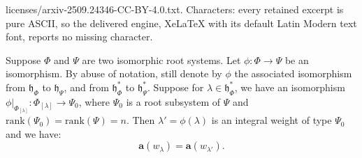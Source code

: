 \documentclass[10pt,a4paper]{amsart}
\newcommand{\aff}{ \mathbf{a} }
\newcommand{\lam}{\lambda}
\begin{document}
licenses/arxiv-2509.24346-CC-BY-4.0.txt. Characters: every retained excerpt is pure ASCII, so the delivered engine, XeLaTeX with its default Latin Modern text font, reports no missing character.
\begin{Thm}\label{transf}
    Suppose  $\Phi$ and $  \Psi$ are two isomorphic root systems. Let $\phi: \Phi \rightarrow \Psi$ be an isomorphism. By abuse of notation, still denote by $\phi$ the associated isomorphism  from $\mathfrak{h}_{\Phi}$ to $\mathfrak{h}_{\Psi}$, and from $\mathfrak{h}_{\Phi}^*$ to $\mathfrak{h}_{\Psi}^*$. Suppose for $\lam\in \mathfrak{h}_{\Phi}^*$, we have  an isomorphism  $\phi|_{\Phi_{[\lam]}}: \Phi_{[\lam]} \rightarrow \Psi_0 $, where $\Psi_0$ is a root subsystem of $\Psi$ and $\mathrm{rank} {(\Psi_0)}=\mathrm{rank} {(\Psi)}=n$. Then $\lam'=\phi(\lam)$ is an integral weight of type $\Psi_0$ and  we have: $$\aff(w_{\lam})=\aff(w_{\lam'}).$$

\end{Thm}
\end{document}
